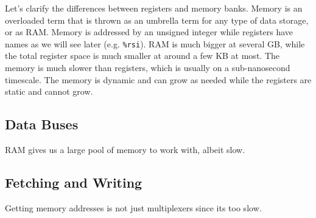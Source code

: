   Let's clarify the differences between registers and memory banks. Memory is an overloaded term that is thrown as an umbrella term for any type of data storage, or as RAM. Memory is addressed by an unsigned integer while registers have names as we will see later (e.g. \texttt{\%rsi}). RAM is much bigger at several GB, while the total register space is much smaller at around a few KB at most. The memory is much slower than registers, which is usually on a sub-nanosecond timescale. The memory is dynamic and can grow as needed while the registers are static and cannot grow.

\subsection{Data Buses} 

  RAM gives us a large pool of memory to work with, albeit slow. 

\subsection{Fetching and Writing} 

  Getting memory addresses is not just multiplexers since its too slow. 


